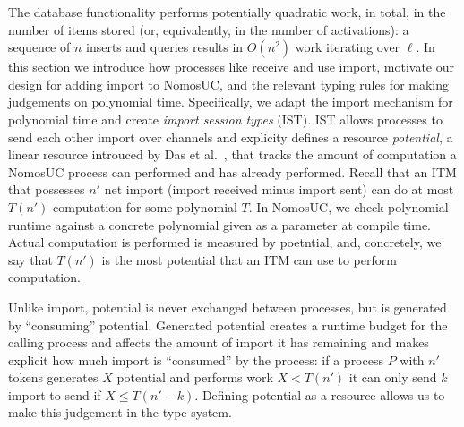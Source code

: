 The database functionality performs potentially quadratic work, in total, in the number of items stored (or, equivalently, in the number of activations): a sequence of $n$ inserts and queries results in $O(n^2)$ work iterating over $\ell$.
In this section we introduce how processes like \Fdb receive and use import, motivate our design for adding import to NomosUC, and the relevant typing rules for making judgements on polynomial time.
Specifically, we adapt the import mechanism for polynomial time and create \emph{import session types} (IST).
IST allows processes to send each other import over channels and explicity defines a resource \emph{potential}, a linear resource introuced by Das et al.~\cite{rast}, that tracks the amount of computation a NomosUC process can performed and has already performed. 
Recall that an ITM that possesses $n'$ net import (import received minus import sent) can do at most $T(n')$ computation for some polynomial $T$.
In NomosUC, we check polynomial runtime against a concrete polynomial given as a parameter at compile time. 
Actual computation is performed is measured by poetntial, and, concretely, we say that $T(n')$ is the most potential that an ITM can use to perform computation. 

Unlike import, potential is never exchanged between processes, but is generated by ``consuming'' potential.
Generated potential creates a runtime budget for the calling process and affects the amount of import it has remaining and makes explicit how much import is ``consumed'' by the process: if a process $P$ with $n'$ tokens generates $X$ potential and performs work $X < T(n')$ it can only send $k$ import to send if $X \leq T(n'-k)$.
Defining potential as a resource allows us to make this judgement in the type system. 

